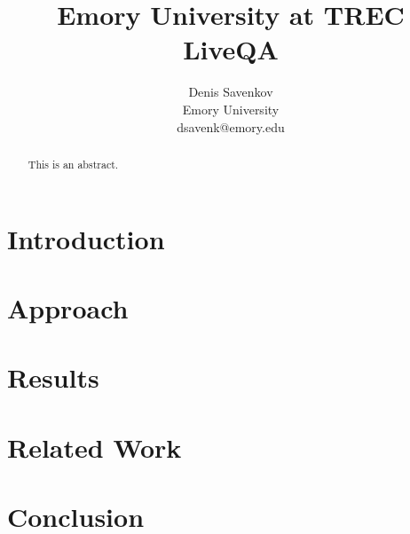 \documentclass[]{article}
\title{Emory University at TREC LiveQA}
\author{Denis Savenkov\\Emory University\\dsavenk@emory.edu}
\begin{document}
\maketitle

\begin{abstract}
This is an abstract.
\end{abstract}

\section{Introduction}

\section{Approach}

\section{Results}

\section{Related Work}

\section{Conclusion}


\end{document}
